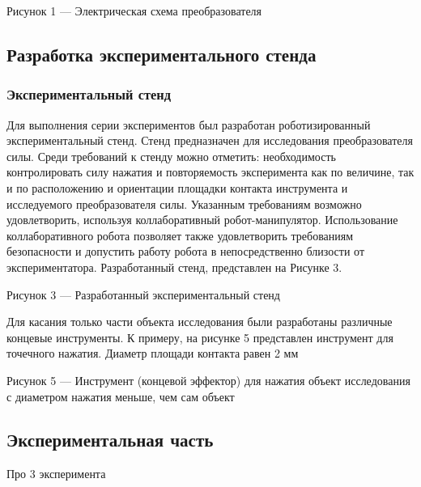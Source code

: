 Рисунок 1 --- Электрическая схема преобразователя


\subsection{Разработка экспериментального
стенда}


\subsubsection{Экспериментальный
стенд}

Для выполнения серии экспериментов был разработан роботизированный
экспериментальный стенд. Стенд предназначен для исследования
преобразователя силы. Среди требований к стенду можно отметить:
необходимость контролировать силу нажатия и повторяемость эксперимента
как по величине, так и по расположению и ориентации площадки контакта
инструмента и исследуемого преобразователя силы. Указанным требованиям
возможно удовлетворить, используя коллаборативный робот-манипулятор.
Использование коллаборативного робота позволяет также удовлетворить
требованиям безопасности и допустить работу робота в непосредственно
близости от экспериментатора. Разработанный стенд, представлен на
Рисунке 3.

Рисунок 3 --- Разработанный экспериментальный стенд

Для касания только части объекта исследования были разработаны различные
концевые инструменты. К примеру, на рисунке 5 представлен инструмент для
точечного нажатия. Диаметр площади контакта равен 2 мм

Рисунок 5 --- Инструмент (концевой эффектор) для нажатия объект
исследования с диаметром нажатия меньше, чем сам объект


\subsection{Экспериментальная
часть}

Про 3 эксперимента